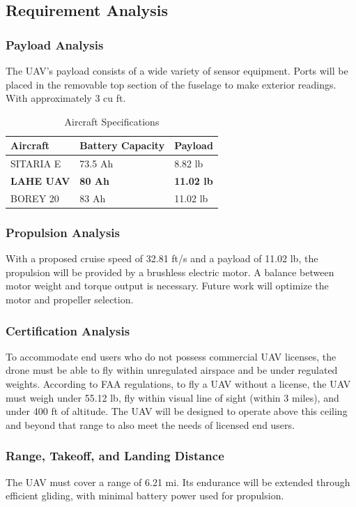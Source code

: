 \documentclass[12pt]{article}
\begin{document}
	\subsection{Requirement Analysis}
	\subsubsection{Payload Analysis}
	The UAV's payload consists of a wide variety of sensor equipment. Ports will be placed in the removable top section of the fuselage to make exterior readings. With approximately 3 cu ft.
	
	\begin{table}[h]
		\centering
		\caption{Aircraft Specifications}
		\begin{tabular}{|l|l|l|}
			\hline
			\textbf{Aircraft} & \textbf{Battery Capacity} & \textbf{Payload} \\ 
			\hline
			SITARIA E & 73.5 Ah & 8.82 lb \\ 
			\hline
			\textbf{LAHE UAV} & \textbf{80 Ah} & \textbf{11.02 lb} \\ 
			\hline
			BOREY 20 & 83 Ah & 11.02 lb \\ 
			\hline
		\end{tabular}
	\end{table}
	
	\subsubsection{Propulsion Analysis}
	With a proposed cruise speed of 32.81 ft/s and a payload of 11.02 lb, the propulsion will be provided by a brushless electric motor. A balance between motor weight and torque output is necessary. Future work will optimize the motor and propeller selection.
	
	\subsubsection{Certification Analysis}
	To accommodate end users who do not possess commercial UAV licenses, the drone must be able to fly within unregulated airspace and be under regulated weights. According to FAA regulations, to fly a UAV without a license, the UAV must weigh under 55.12 lb, fly within visual line of sight (within 3 miles), and under 400 ft of altitude. The UAV will be designed to operate above this ceiling and beyond that range to also meet the needs of licensed end users.
	
	\subsubsection{Range, Takeoff, and Landing Distance}
	The UAV must cover a range of 6.21 mi. Its endurance will be extended through efficient gliding, with minimal battery power used for propulsion.
	
\end{document}

